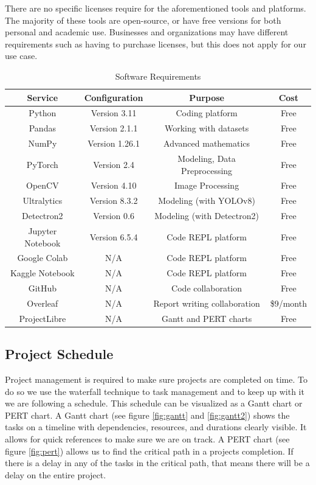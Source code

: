 \documentclass[stu,12pt,floatsintext]{apa7}
\begin{document}
There are no specific licenses require for the aforementioned tools and platforms. The majority of these tools are open-source, or have free versions for both personal and academic use. Businesses and organizations may have different requirements such as having to purchase licenses, but this does not apply for our use case. 

\begin{table}[!htb]
    \centering
    \caption{Software Requirements}
    \begin{tabular}{cccc}
    \hline
         Service& Configuration  &Purpose& Cost \\
         \hline
         Python & Version 3.11  &Coding platform& Free \\
         Pandas & Version 2.1.1  &Working with datasets& Free \\
         NumPy & Version 1.26.1  &Advanced mathematics& Free \\
         PyTorch & Version 2.4& Modeling, Data Preprocessing& Free\\
         OpenCV  & Version 4.10& Image Processing & Free\\
         Ultralytics & Version 8.3.2& Modeling (with YOLOv8)& Free\\
         Detectron2 & Version 0.6& Modeling (with Detectron2)& Free\\
         Jupyter Notebook & Version 6.5.4  &Code REPL platform& Free\\
         Google Colab & N/A  &Code REPL platform& Free\\
         Kaggle Notebook & N/A  &Code REPL platform& Free\\
         GitHub & N/A  &Code collaboration& Free \\
         Overleaf & N/A  &Report writing collaboration& \$9/month \\ 
         ProjectLibre & N/A  &Gantt and PERT charts& Free \\ 
         \hline
    \end{tabular}
    \label{tab:software}
\end{table}

\subsection{Project Schedule}

Project management is required to make sure projects are completed on time. To do so we use the waterfall technique to task management and to keep up with it we are following a schedule. This schedule can be visualized as a Gantt chart or PERT chart. A Gantt chart (see figure \ref{fig:gantt} and \ref{fig:gantt2}) shows the tasks on a timeline with dependencies, resources, and durations clearly visible. It allows for quick references to make sure we are on track. A PERT chart (see figure \ref{fig:pert}) allows us to find the critical path in a projects completion. If there is a delay in any of the tasks in the critical path, that means there will be a delay on the entire project.
\end{document}
